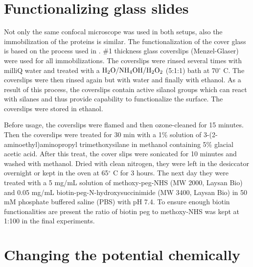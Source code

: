 \documentclass[twoside,single]{lion-msc}
\begin{document}
\section*{Functionalizing glass slides}
Not only the same confocal microscope was used in both setups, also the immobilization of the proteins is similar. The functionalization of the cover glass is based on the process used in \cite{Gupta2014}.  \diameter 25mm \#1 thickness glass coverslips (Menzel-Glaser) were used for all immobilizations. The coverslips were rinsed several times with milliQ water and treated with a  $\textup{H}_{2}\textup{O} / \textup{NH}_{4}\textup{OH} / \textup{H}_{2}\textup{O}_{2}$ (5:1:1) bath at 70$^{\circ}$ C. The coverslips were then rinsed again but with water and finally with ethanol. As a result of this process, the coverslips contain active silanol groups which can react with silanes and thus provide capability to functionalize the surface. The coverslips were stored in ethanol.


Before usage, the coverslips were flamed and then ozone-cleaned for 15 minutes. Then the coverslips were treated for 30 min with a 1\% solution of 3-(2-aminoethyl)aminopropyl trimethoxysilane in methanol containing 5\% glacial acetic acid. After this treat, the cover slips were sonicated for 10 minutes and washed with methanol. Dried with clean nitrogen, they were left in the desiccator overnight or kept in the oven at 65$^{\circ}$ C for 3 hours. The next day they were treated with a 5 mg/mL solution of methoxy-peg-NHS (MW 2000, Laysan Bio) and 0.05 mg/mL biotin-peg-N-hydroxysuccinimide (MW 3400, Laysan Bio) in 50 mM phosphate buffered saline (PBS)  with pH 7.4. To ensure enough biotin functionalities are present the ratio of biotin peg to methoxy-NHS was kept at 1:100 in the final experiments.  






\section{Changing the potential chemically}\label{pot_chem}
\end{document}

